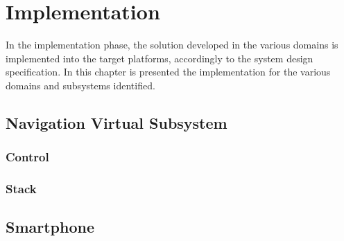 \chapter{Implementation}%
\label{ch:implementation}
In the implementation phase, the solution developed in the various domains is
implemented into the target platforms, accordingly to the system design
specification. In this chapter is presented the implementation for the various domains and subsystems identified.
%
\section{Navigation Virtual Subsystem}%
\label{sec:navig-virt-subsyst-implem}
%
%
\subsection{Control}%
\label{sec:control-design}

%
\subsection{Stack}%
\label{sec:stack-implem}

%

%
\section{Smartphone}%
\label{sec:smartphone-implem}

%
